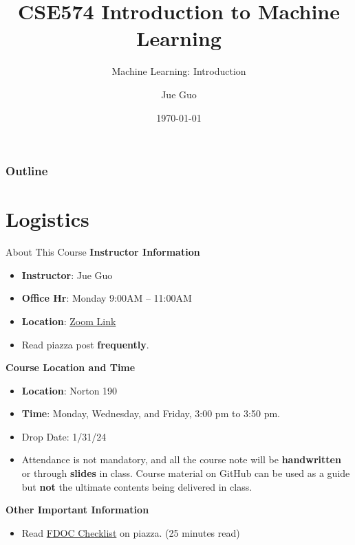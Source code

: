 \documentclass[10pt,dvipsnames]{beamer}
\title{CSE574 Introduction to Machine Learning}
\subtitle{Machine Learning: Introduction}
\author{Jue Guo}
\institute{University at Buffalo}
\date{\today}
\begin{document}
\begin{frame}
    \titlepage
\end{frame}

\begin{frame}
    \frametitle{Outline}
    \tableofcontents
\end{frame}
\section{Logistics}
\begin{frame}{About This Course}
    \textbf{Instructor Information}
    \begin{itemize}
        \item \textbf{Instructor}: Jue Guo
        \item \textbf{Office Hr}: Monday 9:00AM -- 11:00AM
        \item \textbf{Location}: \href{https://buffalo.zoom.us/j/7673733717?pwd=TktTVXlDOGgxM3dRUC9UT21hNEdOQT09&omn=92002344719}{Zoom Link}
        \item Read piazza post \textbf{frequently}.
    \end{itemize}
    \textbf{Course Location and Time}
    \begin{itemize}
        \item \textbf{Location}: Norton 190
        \item \textbf{Time}: Monday, Wednesday, and Friday, 3:00 pm to 3:50 pm.
        \item Drop Date: 1/31/24
        \item Attendance is not mandatory, and all the course note will be \textbf{handwritten} or through \textbf{slides} in class. Course material on GitHub can be used as a guide but \textbf{not} the ultimate contents being delivered in class.
    \end{itemize}
    \textbf{Other Important Information}
    \begin{itemize}
        \item Read \href{https://piazza.com/class/lq6pes9vr0v135/post/20}{FDOC Checklist} on piazza. (25 minutes read)
    \end{itemize}

\end{frame}
\end{document}
